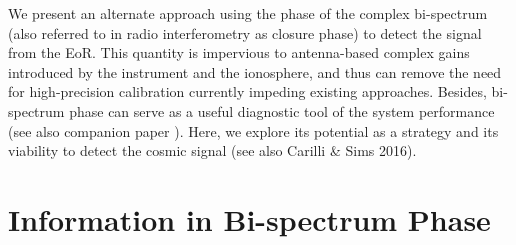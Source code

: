 \documentclass[
reprint,
superscriptaddress,
amsmath,
amssymb,
aps,
prd
]{revtex4-1}
\begin{document}
We present an alternate approach using the phase of the complex bi-spectrum (also referred to in radio interferometry as closure phase) to detect the signal from the EoR. This quantity is impervious to antenna-based complex gains introduced by the instrument and the ionosphere, and thus can remove the need for high-precision calibration currently impeding existing approaches. Besides, bi-spectrum phase can serve as a useful diagnostic tool of the system performance (see also companion paper \cite{car18}). Here, we explore its potential as a strategy and its viability to detect the cosmic signal (see also Carilli \& Sims 2016).

\section{Information in Bi-spectrum Phase}\label{sec:CPinfo}
\end{document}
